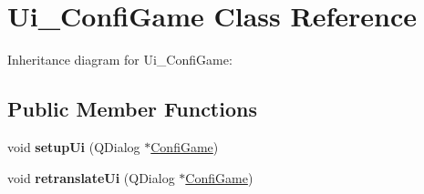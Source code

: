 \hypertarget{class_ui___confi_game}{}\section{Ui\+\_\+\+Confi\+Game Class Reference}
\label{class_ui___confi_game}


Inheritance diagram for Ui\+\_\+\+Confi\+Game\+:
\subsection*{Public Member Functions}
\begin{DoxyCompactItemize}
\item 
\mbox{\label{class_ui___confi_game_a359eba96f6d37a95fe8b9509fff50845}} 
void {\bfseries setup\+Ui} (Q\+Dialog $\ast$\hyperlink{class_confi_game}{Confi\+Game})
\item 
\mbox{\label{class_ui___confi_game_a0b51ecd0fbcf5b4ca22c1bc105356c37}} 
void {\bfseries retranslate\+Ui} (Q\+Dialog $\ast$\hyperlink{class_confi_game}{Confi\+Game})
\end{DoxyCompactItemize}
